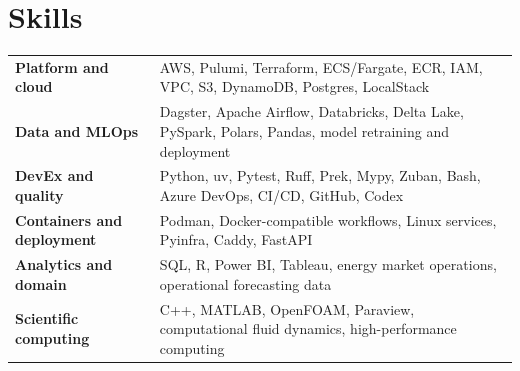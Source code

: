 \documentclass[10pt,a4paper]{article}
\newcommand{\resumesection}[1]{\section*{#1}}
\begin{document}
\resumesection{Skills}
\begin{tabularx}{\textwidth}{@{}>{\bfseries\color{textdark}}lX@{}}
Platform and cloud & AWS, Pulumi, Terraform, ECS/Fargate, ECR, IAM, VPC, S3, DynamoDB, Postgres, LocalStack \\
Data and MLOps & Dagster, Apache Airflow, Databricks, Delta Lake, PySpark, Polars, Pandas, model retraining and deployment \\
DevEx and quality & Python, uv, Pytest, Ruff, Prek, Mypy, Zuban, Bash, Azure DevOps, CI/CD, GitHub, Codex \\
Containers and deployment & Podman, Docker-compatible workflows, Linux services, Pyinfra, Caddy, FastAPI \\
Analytics and domain & SQL, R, Power BI, Tableau, energy market operations, operational forecasting data \\
Scientific computing & C++, MATLAB, OpenFOAM, Paraview, computational fluid dynamics, high-performance computing \\
\end{tabularx}
\end{document}
